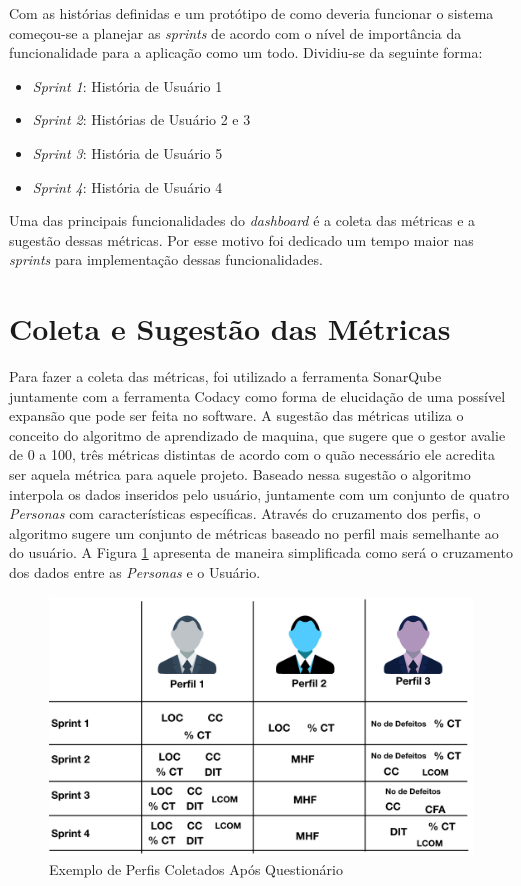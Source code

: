 Com as histórias definidas e um protótipo de como deveria funcionar o sistema começou-se a planejar as \textit{sprints} de acordo com o nível de importância da funcionalidade para a aplicação como um todo. Dividiu-se da seguinte forma:

\begin{itemize}
\item\textit{Sprint 1}: História  de Usuário 1
\item\textit{Sprint 2}: Histórias  de Usuário 2 e 3
\item\textit{Sprint 3}: História  de Usuário 5
\item\textit{Sprint 4}: História  de Usuário 4
\end{itemize}

Uma das principais funcionalidades do \textit{dashboard} é a coleta das métricas e a sugestão dessas métricas. Por esse motivo foi dedicado um tempo maior nas \textit{sprints} para implementação dessas funcionalidades.   

\section{Coleta e Sugestão das Métricas}

Para fazer a coleta das métricas, foi utilizado a ferramenta SonarQube juntamente com a ferramenta Codacy como forma de elucidação de uma possível expansão que pode ser feita no software. A sugestão das métricas utiliza o conceito do algoritmo de aprendizado de maquina, que sugere que o gestor avalie de 0 a 100, três métricas distintas de acordo com o quão necessário ele acredita ser aquela métrica para aquele projeto. Baseado nessa sugestão o algoritmo interpola os dados inseridos pelo usuário, juntamente com um conjunto de quatro \textit{Personas} com características específicas. Através do cruzamento dos perfis, o algoritmo sugere um conjunto de métricas baseado no perfil mais semelhante ao do usuário. A Figura \ref{img:perfis} apresenta de maneira simplificada como será o cruzamento dos dados entre as \textit{Personas} e o Usuário.

\graphicspath{{figuras/}}
\begin{figure}[h!]
\centering
\includegraphics[scale=0.50]{perfis_exemplo.png}
\caption{Exemplo de Perfis Coletados Após Questionário}
\label{img:perfis}
\end{figure}

